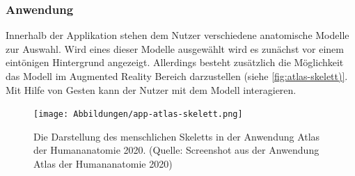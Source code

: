 \subsubsection{Anwendung}
Innerhalb der Applikation stehen dem Nutzer verschiedene anatomische Modelle zur Auswahl. Wird eines dieser Modelle ausgewählt wird es zunächst vor einem eintönigen Hintergrund angezeigt. Allerdings besteht zusätzlich die Möglichkeit das Modell im Augmented Reality Bereich darzustellen (siehe \ref{fig:atlas-skelett)}. \\
Mit Hilfe von Gesten kann der Nutzer mit dem Modell interagieren.
\begin{figure}[h!]
\centering
\texttt{[image: Abbildungen/app-atlas-skelett.png]}
\caption[Atlas der Humananatomie]{Die Darstellung des menschlichen Skeletts in der Anwendung \glqq Atlas der Humananatomie 2020\grqq . (Quelle: Screenshot aus der Anwendung \glqq Atlas der Humananatomie 2020\grqq )}
\label{fig:atlas-skelett}
\end{figure}
